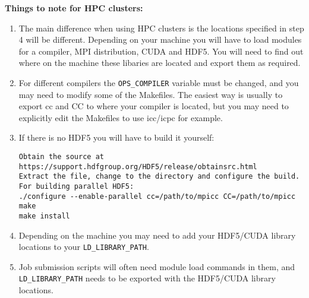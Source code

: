 \documentclass[11pt]{article}
\begin{document}
\textbf{Things to note for HPC clusters:}\\
\begin{enumerate}
\item{The main difference when using HPC clusters is the locations specified in step 4 will be different. Depending on your machine you will have to load modules for a compiler, MPI distribution, CUDA and HDF5. You will need to find out where on the machine these libaries are located and export them as required.}

\item{For different compilers the \verb|OPS_COMPILER| variable must be changed, and you may need to modify some of the Makefiles. The easiest way is usually to export cc and CC to where your compiler is located, but you may need to explicitly edit the Makefiles to use icc/icpc for example.}

\item{If there is no HDF5 you will have to build it yourself:}
\begin{verbatim}
Obtain the source at https://support.hdfgroup.org/HDF5/release/obtainsrc.html
Extract the file, change to the directory and configure the build.
For building parallel HDF5:
./configure --enable-parallel cc=/path/to/mpicc CC=/path/to/mpicc
make
make install
\end{verbatim} 

\item{Depending on the machine you may need to add your HDF5/CUDA library locations to your \verb|LD_LIBRARY_PATH|.}

\item{Job submission scripts will often need module load commands in them, and \verb|LD_LIBRARY_PATH| needs to be exported with the HDF5/CUDA library locations.}

\end{enumerate}
\end{document}
